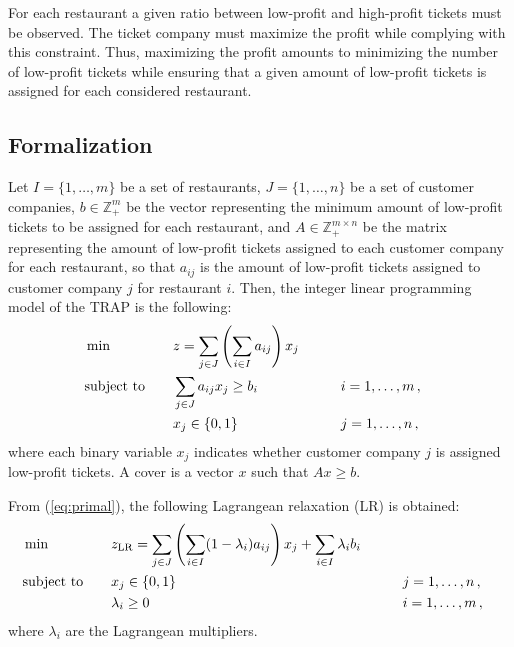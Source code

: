 \documentclass[runningheads]{llncs}
\begin{document}
For each restaurant a given ratio between low-profit and high-profit tickets must be observed. 
The ticket company must maximize the profit while complying with this constraint. Thus, maximizing the profit amounts to minimizing the number of low-profit tickets while ensuring that a given amount of low-profit tickets is assigned for each considered restaurant.

\subsection{Formalization}
\label{subsec:problem:formalization}

Let $I = \{1,\dots,m\}$ be a set of restaurants, $J = \{1,\dots,n\}$ be a set of customer companies, $b \in \mathbb{Z}_{+}^{m}$ be the vector representing the minimum amount of low-profit tickets to be assigned for each restaurant, and $A \in \mathbb{Z}_{+}^{m \times n}$ be the matrix representing the amount of low-profit tickets assigned to each customer company for each restaurant, so that $a_{ij}$ is the amount of low-profit tickets assigned to customer company $j$ for restaurant $i$. Then, the integer linear programming model of the TRAP is the following:
\begin{alignat}{3}
  &\min & \quad & z = \sum_{j \in J} \left( \sum_{i \in I} a_{ij} \right) x_j \label{eq:primal}\\
  &\text{subject to}  &       & \sum_{j \in J} a_{ij} x_j \ge b_i & \qquad & i = 1,\dots,m \, , \notag\\
  &                   &       & x_j \in \{0,1\}  &\qquad& j = 1,\dots,n \, , \notag
\end{alignat}
where each binary variable $x_j$ indicates whether customer company $j$ is assigned low-profit tickets. A cover is a vector $x$ such that $Ax \ge b$.

From (\ref{eq:primal}), the following Lagrangean relaxation (LR) is obtained:
\begin{alignat}{3}
  &\min & \quad & z_{\text{LR}} = \sum_{j \in J} \left( \sum_{i \in I} (1 - \lambda_i) a_{ij} \right) x_j + \sum_{i \in I} \lambda_i b_i \label{eq:lagrangean}\\
  &\text{subject to}  &       & x_j \in \{0,1\} & \qquad & j = 1,\dots,n \, , \notag\\
  &                   &       & \lambda_i \ge 0  & \qquad & i = 1,\dots,m \, , \notag
\end{alignat}
where $\lambda_i$ are the Lagrangean multipliers.
\end{document}
